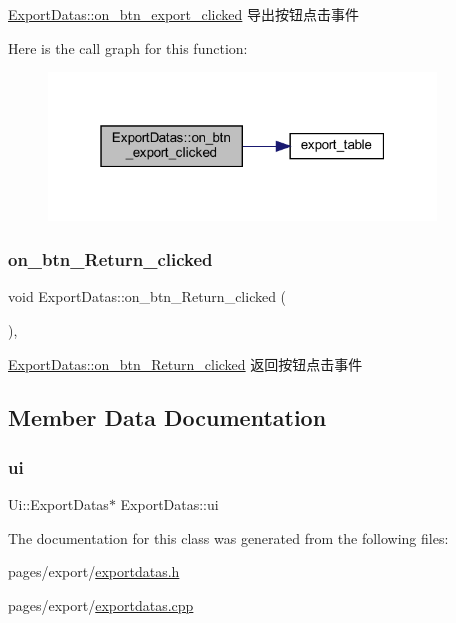 \mbox{\hyperlink{class_export_datas_a937c315ff3df44fa7693741cc9f046a4}{Export\+Datas\+::on\+\_\+btn\+\_\+export\+\_\+clicked}} 导出按钮点击事件 

Here is the call graph for this function\+:
\nopagebreak
\begin{figure}[H]
\begin{center}
\leavevmode
\includegraphics[width=292pt]{class_export_datas_a937c315ff3df44fa7693741cc9f046a4_cgraph}
\end{center}
\end{figure}
\mbox{\label{class_export_datas_aabc1ba322fdca1fd2eb40e123eb68f92}} 
\subsubsection{\texorpdfstring{on\_btn\_Return\_clicked}{on\_btn\_Return\_clicked}}
{\footnotesize\ttfamily void Export\+Datas\+::on\+\_\+btn\+\_\+\+Return\+\_\+clicked (\begin{DoxyParamCaption}{ }\end{DoxyParamCaption})\hspace{0.3cm}{\ttfamily [private]}, {\ttfamily [slot]}}



\mbox{\hyperlink{class_export_datas_aabc1ba322fdca1fd2eb40e123eb68f92}{Export\+Datas\+::on\+\_\+btn\+\_\+\+Return\+\_\+clicked}} 返回按钮点击事件 



\subsection{Member Data Documentation}
\mbox{\label{class_export_datas_afc65ebd628b8160037d1025c03f261ef}} 
\subsubsection{\texorpdfstring{ui}{ui}}
{\footnotesize\ttfamily Ui\+::\+Export\+Datas$\ast$ Export\+Datas\+::ui\hspace{0.3cm}{\ttfamily [private]}}



The documentation for this class was generated from the following files\+:\begin{DoxyCompactItemize}
\item 
pages/export/\mbox{\hyperlink{exportdatas_8h}{exportdatas.\+h}}\item 
pages/export/\mbox{\hyperlink{exportdatas_8cpp}{exportdatas.\+cpp}}\end{DoxyCompactItemize}

